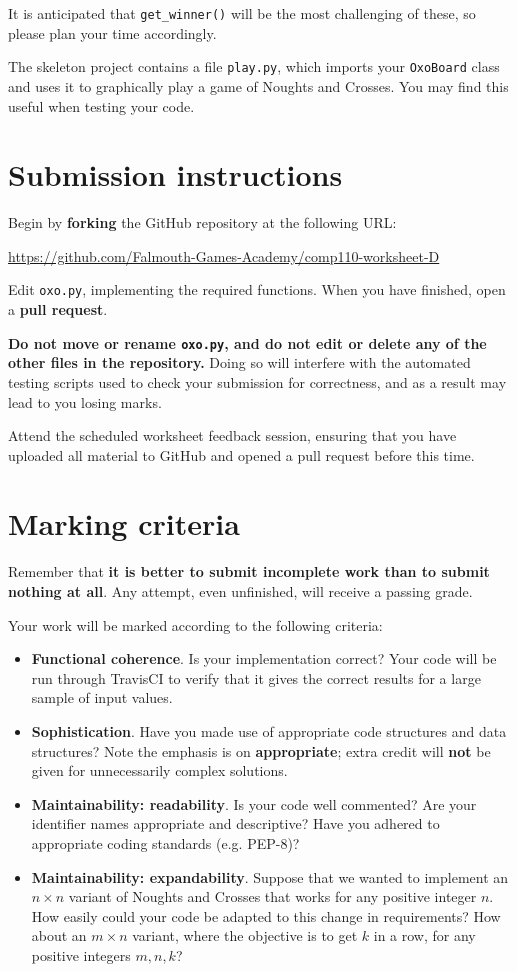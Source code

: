 \documentclass{../../../fal_assignment}
\begin{document}
It is anticipated that \lstinline{get_winner()} will be the most challenging of these,
so please plan your time accordingly.

The skeleton project contains a file \texttt{play.py}, which imports your \lstinline{OxoBoard} class
and uses it to graphically play a game of Noughts and Crosses. You may find this useful when testing your code.

\section*{Submission instructions}

Begin by \textbf{forking} the GitHub repository at the following URL:

\url{https://github.com/Falmouth-Games-Academy/comp110-worksheet-D}

Edit \texttt{oxo.py}, implementing the required functions.
When you have finished, open a \textbf{pull request}.

\textbf{Do not move or rename \texttt{oxo.py}, and do not edit or delete any of the other files in the repository.}
Doing so will interfere with the automated testing scripts used to check your submission for correctness,
and as a result may lead to you losing marks.

Attend the scheduled worksheet feedback session,
ensuring that you have uploaded all material to GitHub and opened a pull request before this time.

\section*{Marking criteria}

Remember that \textbf{it is better to submit incomplete work than to submit nothing at all}.
Any attempt, even unfinished, will receive a passing grade.

Your work will be marked according to the following criteria:
\begin{itemize}
	\item \textbf{Functional coherence}. Is your implementation correct?
		Your code will be run through TravisCI to verify that it gives the correct results for a large sample of input values.
	\item \textbf{Sophistication}. Have you made use of appropriate code structures and data structures?
		Note the emphasis is on \textbf{appropriate}; extra credit will \textbf{not} be given for unnecessarily complex solutions.
	\item \textbf{Maintainability: readability}. Is your code well commented? Are your identifier names appropriate and descriptive?
		Have you adhered to appropriate coding standards (e.g. PEP-8)?
	\item \textbf{Maintainability: expandability}. Suppose that we wanted to implement an $n \times n$ variant of Noughts and Crosses
		that works for any positive integer $n$.
		How easily could your code be adapted to this change in requirements?
		How about an $m \times n$ variant, where the objective is to get $k$ in a row,
		for any positive integers $m,n,k$?
\end{itemize}
\end{document}
